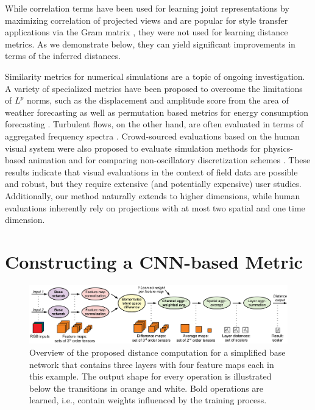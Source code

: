\documentclass{article}
\begin{document}
While correlation terms have been used for learning joint representations by maximizing correlation of projected views \citep{chandar2016} and are popular for style transfer applications via the Gram matrix \citep{ruder2016},
they were not used for learning distance metrics. As we demonstrate below, they can yield significant improvements in terms of the inferred distances.

Similarity metrics for numerical simulations are a topic of ongoing investigation. A variety of specialized metrics have been proposed to overcome the limitations of $L^p$ norms, such as the displacement and amplitude score from the area of weather forecasting \citep{keil2009} as well as permutation based metrics for energy consumption forecasting \citep{haben2014}. Turbulent flows, on the other hand, are often evaluated in terms of aggregated frequency spectra \citep{pitsch2006}. Crowd-sourced evaluations based on the human visual system were also proposed to evaluate simulation methods for physics-based animation \citep{um2017} and for comparing non-oscillatory discretization schemes \citep{um2019}. 
These results indicate that visual evaluations in the context of field data are possible and robust, but they require extensive (and potentially expensive) user studies. Additionally, our method naturally extends to higher dimensions, while human evaluations inherently rely on projections with at most two spatial and one time dimension.



\section{Constructing a CNN-based Metric} \label{sec: lsim}

\begin{figure}[bp]
    \centering
    \includegraphics[width=1.0\textwidth]{Images/DistanceComputation}
    \vspace{-0.7cm}
    \caption{Overview of the proposed distance computation for a simplified base network that contains three layers with four feature maps each in this example. The output shape for every operation is illustrated below the transitions in orange and white. Bold operations are learned, i.e., contain weights influenced by the training process.}
    \label{fig: distance computation}
\end{figure}
\end{document}
